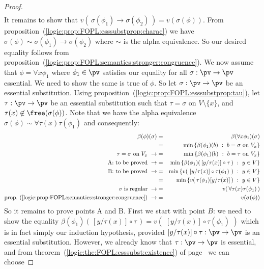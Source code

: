 \begin{proof}
\begin{eqnarray*}
    \end{eqnarray*}
It remains to show that
$v(\,\sigma(\phi_{1})\to\sigma(\phi_{2})\,)=v(\sigma(\phi))$. From
proposition~(\ref{logic:prop:FOPL:esssubstprop:charac}) we have
$\sigma(\phi)\sim\sigma(\phi_{1})\to\sigma(\phi_{2})$ where $\sim$
is the alpha equivalence. So our desired equality follows from
proposition~(\ref{logic:prop:FOPL:semantics:stronger:congruence}).
We now assume that $\phi=\forall x\phi_{1}$ where $\phi_{1}\in\pv$
satisfies our equality for all $\sigma:\pv\to\pv$ essential. We need
to show the same is true of $\phi$. So let $\sigma:\pv\to\pv$ be an
essential substitution. Using
proposition~(\ref{logic:prop:FOPL:esssubstprop:tau}), let
$\tau:\pv\to\pv$ be an essential substitution such that
$\tau=\sigma$ on $V\setminus\{x\}$, and
$\tau(x)\not\in\free(\sigma(\phi))$. Note that we have the
alpha equivalence
$\sigma(\phi)\sim\forall\tau(x)\tau(\phi_{1})$ and consequently:
    \begin{eqnarray*}
    \beta(\phi)(\sigma)&=&\beta(\forall x\phi_{1})(\sigma)\\
    &=&\min\left\{\beta(\phi_{1})(b)\ :\ b=\sigma\mbox{\ on\
    }V_{x}\right\}\\
    \tau=\sigma\mbox{\ on\ }V_{x}\ \rightarrow
    &=&\min\left\{\beta(\phi_{1})(b)\ :\ b=\tau\mbox{\ on\
    }V_{x}\right\}\\
    \mbox{A: to be proved}\ \rightarrow
    &=&\min\left\{\beta(\phi_{1})(\,[y/\tau(x)]\circ\tau\,)\ :\ y\in V\right\}\\
    \mbox{B: to be proved}\ \rightarrow
    &=&\min\left\{v(\,\,[y/\tau(x)]\circ\tau(\phi_{1})\,\,)\ :\ y\in V\right\}\\
    &=&\min\left\{v(\,\tau(\phi_{1})[y/\tau(x)]\,)\ :\ y\in V\right\}\\
    \mbox{$v$ is regular}\ \rightarrow&=&v(\,\forall\tau(x)\tau(\phi_{1})\,)\\
    \mbox{prop.~(\ref{logic:prop:FOPL:semantics:stronger:congruence})}\ \rightarrow
    &=&v(\sigma(\phi))
    \end{eqnarray*}
So it remains to prove points A and B. First we start with point
$B$: we need to show the equality
$\beta(\phi_{1})(\,[y/\tau(x)]\circ\tau\,)=v(\,\,[y/\tau(x)]\circ\tau(\phi_{1})\,\,)$
which is in fact simply our induction hypothesis, provided
$[y/\tau(x)]\circ\tau:\pv\to\pv$ is an essential substitution.
However, we already know that $\tau:\pv\to\pv$ is essential, and
from theorem~(\ref{logic:the:FOPL:esssubst:existence}) of
page~\pageref{logic:the:FOPL:esssubst:existence} we can choose

\end{proof}
